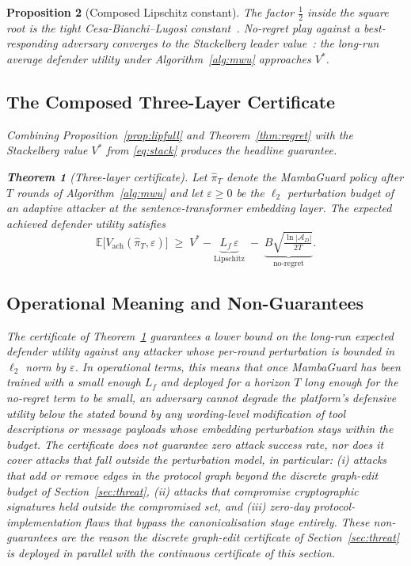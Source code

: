 \documentclass{ieeeaccess}
\newcommand{\E}{\mathbb{E}}
\newcommand{\calA}{\mathcal{A}}
\newtheorem{theorem}{Theorem}
\newtheorem{proposition}[theorem]{Proposition}
\begin{document}
\begin{proposition}[Composed Lipschitz constant]
The factor $\tfrac{1}{2}$ inside the square root is the tight Cesa-Bianchi--Lugosi constant~\cite{CesaBianchi2006Prediction,Arora2012MWU}. No-regret play against a best-responding adversary converges to the Stackelberg leader value~\cite{Balcan2015Commitment}: the long-run average defender utility under Algorithm~\ref{alg:mwu} approaches $V^{*}$.

\subsection{The Composed Three-Layer Certificate}
\label{sec:composed}
Combining Proposition~\ref{prop:lipfull} and Theorem~\ref{thm:regret} with the Stackelberg value $V^{*}$ from \eqref{eq:stack} produces the headline guarantee.

\begin{theorem}[Three-layer certificate]
\label{thm:certificate}
Let $\hat\pi_{T}$ denote the MambaGuard policy after $T$ rounds of Algorithm~\ref{alg:mwu} and let $\varepsilon\ge 0$ be the $\ell_{2}$ perturbation budget of an adaptive attacker at the sentence-transformer embedding layer. The expected achieved defender utility satisfies
\begin{equation}
\E\bigl[V_{\text{ach}}(\hat\pi_{T},\varepsilon)\bigr] \;\ge\; V^{*}-\underbrace{L_{f}\,\varepsilon}_{\text{Lipschitz}} \;-\; \underbrace{B\sqrt{\tfrac{\ln|\calA_{D}|}{2T}}}_{\text{no-regret}}.
\label{eq:certificate}
\end{equation}
\end{theorem}

\subsection{Operational Meaning and Non-Guarantees}
\label{sec:cert-meaning}
The certificate of Theorem~\ref{thm:certificate} guarantees a lower bound on the long-run expected defender utility against any attacker whose per-round perturbation is bounded in $\ell_{2}$ norm by $\varepsilon$. In operational terms, this means that once MambaGuard has been trained with a small enough $L_{f}$ and deployed for a horizon $T$ long enough for the no-regret term to be small, an adversary cannot degrade the platform's defensive utility below the stated bound by any wording-level modification of tool descriptions or message payloads whose embedding perturbation stays within the budget. The certificate does \emph{not} guarantee zero attack success rate, nor does it cover attacks that fall outside the perturbation model, in particular: (i) attacks that add or remove edges in the protocol graph beyond the discrete graph-edit budget of Section~\ref{sec:threat}, (ii) attacks that compromise cryptographic signatures held outside the compromised set, and (iii) zero-day protocol-implementation flaws that bypass the canonicalisation stage entirely. These non-guarantees are the reason the discrete graph-edit certificate of Section~\ref{sec:threat} is deployed in parallel with the continuous certificate of this section.


\end{proposition}
\end{document}
